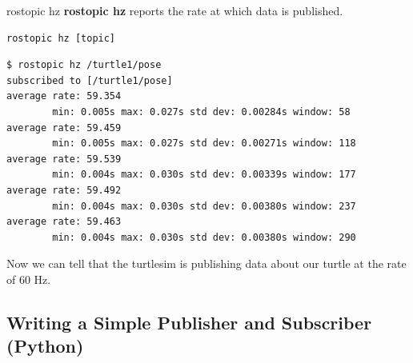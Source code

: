 \begin{frame}[fragile]{rostopic hz}
\textbf{rostopic hz} reports the rate at which data is published.

\begin{lstlisting}[language=syntax]
rostopic hz [topic]
\end{lstlisting}

\begin{lstlisting}[language=shell]
$ rostopic hz /turtle1/pose
subscribed to [/turtle1/pose]
average rate: 59.354
        min: 0.005s max: 0.027s std dev: 0.00284s window: 58
average rate: 59.459
        min: 0.005s max: 0.027s std dev: 0.00271s window: 118
average rate: 59.539
        min: 0.004s max: 0.030s std dev: 0.00339s window: 177
average rate: 59.492
        min: 0.004s max: 0.030s std dev: 0.00380s window: 237
average rate: 59.463
        min: 0.004s max: 0.030s std dev: 0.00380s window: 290
\end{lstlisting}
Now we can tell that the turtlesim is publishing data about our turtle at the rate of 60 Hz.
\end{frame}

\subsection{Writing a Simple Publisher and Subscriber (Python)}

